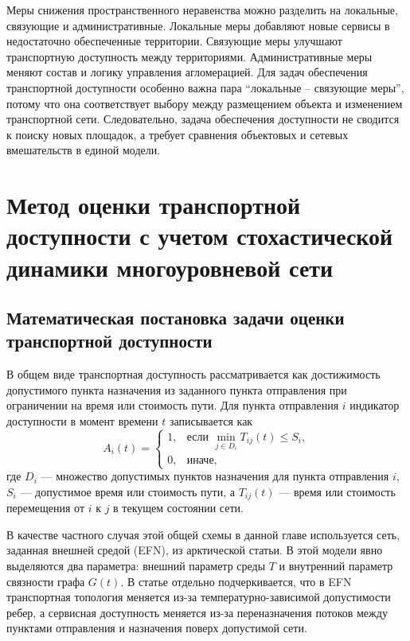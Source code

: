 \documentclass[14pt,a4paper]{extarticle}
\begin{document}
Меры снижения пространственного неравенства можно разделить на локальные, связующие и административные. Локальные меры добавляют новые сервисы в недостаточно обеспеченные территории. Связующие меры улучшают транспортную доступность между территориями. Административные меры меняют состав и логику управления агломерацией. Для задач обеспечения транспортной доступности особенно важна пара ``локальные -- связующие меры'', потому что она соответствует выбору между размещением объекта и изменением транспортной сети. Следовательно, задача обеспечения доступности не сводится к поиску новых площадок, а требует сравнения объектовых и сетевых вмешательств в единой модели.

\section*{Метод оценки транспортной доступности с учетом стохастической динамики многоуровневой сети}

\subsection*{Математическая постановка задачи оценки транспортной доступности}

В общем виде транспортная доступность рассматривается как достижимость допустимого пункта назначения из заданного пункта отправления при ограничении на время или стоимость пути. Для пункта отправления \(i\) индикатор доступности в момент времени \(t\) записывается как
\[
A_i(t)=
\begin{cases}
1, & \text{если } \min\limits_{j\in D_i} T_{ij}(t)\le S_i,\\
0, & \text{иначе},
\end{cases}
\]
где \(D_i\) --- множество допустимых пунктов назначения для пункта отправления \(i\), \(S_i\) --- допустимое время или стоимость пути, а \(T_{ij}(t)\) --- время или стоимость перемещения от \(i\) к \(j\) в текущем состоянии сети.

В качестве частного случая этой общей схемы в данной главе используется сеть, заданная внешней средой (EFN), из арктической статьи. В этой модели явно выделяются два параметра: внешний параметр среды \(T\) и внутренний параметр связности графа \(G(t)\). В статье отдельно подчеркивается, что в EFN транспортная топология меняется из-за температурно-зависимой допустимости ребер, а сервисная доступность меняется из-за переназначения потоков между пунктами отправления и назначения поверх допустимой сети.
\end{document}
